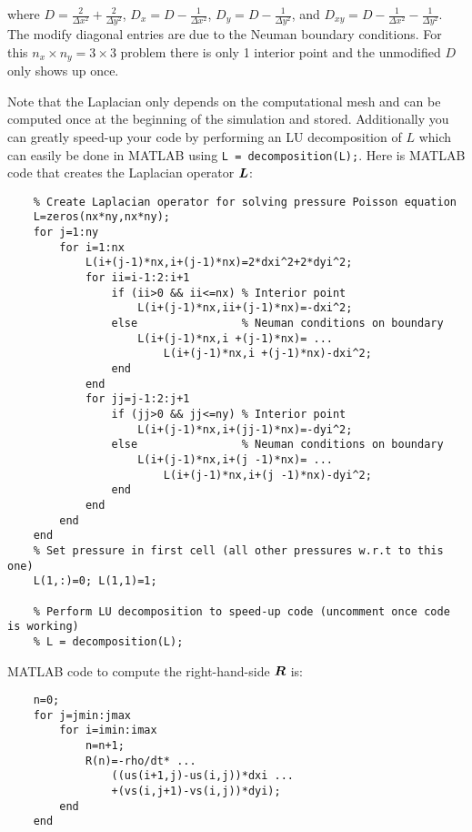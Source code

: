 \documentclass[]{article}
\def\bm#1{\mbox{\boldmath{$#1$}}}
\begin{document}
where $D=\frac{2}{\Delta x^2}+\frac{2}{\Delta y^2}$, $D_x=D-\frac{1}{\Delta x^2}$, $D_y=D-\frac{1}{\Delta y^2}$, and $D_{xy}=D-\frac{1}{\Delta x^2} - \frac{1}{\Delta y^2}$.  The modify diagonal entries are due to the Neuman boundary conditions. For this $n_x\times n_y=3\times3$ problem there is only 1 interior point and the unmodified $D$ only shows up once. 

 Note that the Laplacian only depends on the computational mesh and can be computed once at the beginning of the simulation and stored.  Additionally you can greatly speed-up your code by performing an LU decomposition of $L$ which can easily be done in MATLAB using \lstinline{L = decomposition(L);}. Here is MATLAB code that creates the Laplacian operator $\bm{L}$:

\noindent\begin{minipage}{\linewidth}
\begin{lstlisting}
    % Create Laplacian operator for solving pressure Poisson equation 
    L=zeros(nx*ny,nx*ny);
    for j=1:ny
        for i=1:nx
            L(i+(j-1)*nx,i+(j-1)*nx)=2*dxi^2+2*dyi^2;
            for ii=i-1:2:i+1
                if (ii>0 && ii<=nx) % Interior point
                    L(i+(j-1)*nx,ii+(j-1)*nx)=-dxi^2;
                else                % Neuman conditions on boundary
                    L(i+(j-1)*nx,i +(j-1)*nx)= ...
                        L(i+(j-1)*nx,i +(j-1)*nx)-dxi^2;
                end
            end
            for jj=j-1:2:j+1
                if (jj>0 && jj<=ny) % Interior point
                    L(i+(j-1)*nx,i+(jj-1)*nx)=-dyi^2;
                else                % Neuman conditions on boundary
                    L(i+(j-1)*nx,i+(j -1)*nx)= ...
                        L(i+(j-1)*nx,i+(j -1)*nx)-dyi^2;
                end
            end
        end
    end
    % Set pressure in first cell (all other pressures w.r.t to this one)
    L(1,:)=0; L(1,1)=1;

    % Perform LU decomposition to speed-up code (uncomment once code is working)
    % L = decomposition(L);
\end{lstlisting}
\end{minipage}

MATLAB code to compute the right-hand-side $\bm{R}$ is:
\begin{lstlisting}
    n=0;
    for j=jmin:jmax
        for i=imin:imax 
            n=n+1;
            R(n)=-rho/dt* ...
                ((us(i+1,j)-us(i,j))*dxi ...
                +(vs(i,j+1)-vs(i,j))*dyi);
        end
    end
\end{lstlisting}
\end{document}
